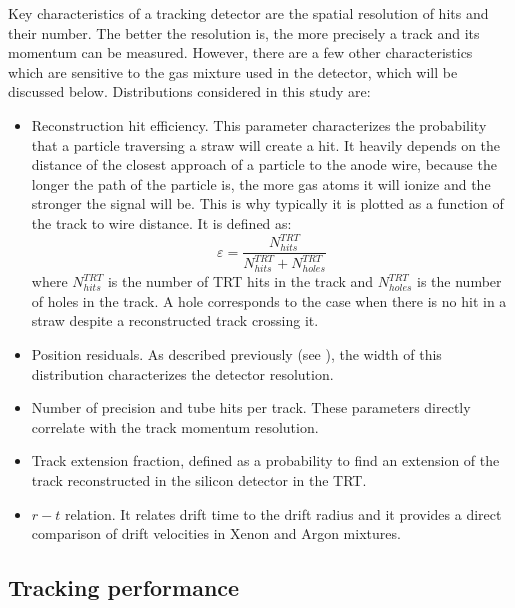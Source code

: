 Key characteristics of a tracking detector are the spatial resolution of hits and their number. 
The better the resolution is, the more precisely a track and its momentum can be measured.
However, there are a few other characteristics which are sensitive to the gas mixture used in the detector, which will be discussed below.
Distributions considered in this study are:
\begin{itemize}
 \item Reconstruction hit efficiency. This parameter characterizes the probability that a particle traversing a straw will create a hit.
 It heavily depends on the distance of the closest approach of a particle to the anode wire, because the longer the path of the particle is, the more gas atoms it will ionize and the stronger the signal will be. This is why typically it is plotted as a function of the track to wire distance. It is defined as:
 \begin{equation}
  \varepsilon = \dfrac{N^{TRT}_{hits}}{N^{TRT}_{hits} + N^{TRT}_{holes}}
 \label{eq:hit_eff}
 \end{equation}
 where $N^{TRT}_{hits}$ is the number of TRT hits in the track and $N^{TRT}_{holes}$ is the number of holes in the track. A hole corresponds to the case when there is no hit in a straw
 despite a reconstructed track crossing it.
 \item Position residuals. As described previously (see ), the width of this distribution characterizes the detector resolution.
 \item Number of precision and tube hits per track. These parameters directly correlate with the track momentum resolution.
 \item Track extension fraction, defined as a probability to find an extension of the track reconstructed in the silicon detector in the TRT.
 \item $r-t$ relation. It relates drift time to the drift radius and it provides a direct comparison of drift velocities in Xenon and Argon mixtures.
\end{itemize}


\subsection{Tracking performance}
\label{subsec:TRT:trackPerf}

